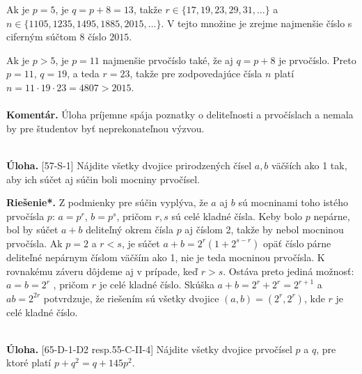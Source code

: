 \documentclass[11pt,a4paper,oneside,final]{book}
\newcommand{\kom}{\textbf{Komentár.} }
\newcommand{\ul}{\textbf{Úloha.} }
\newcommand{\rieh}{\textbf{Riešenie*.} }
\begin{document}
Ak je $p = 5$, je $q = p + 8 = 13$, takže $r \in \{17, 19, 23, 29, 31, \ldots \}$ a $n \in \{1 105,1 235, 1 495, 1 885, 2 015, \ldots\}$. V tejto množine je zrejme najmenšie číslo s ciferným súčtom 8 číslo $2 015$.

Ak je $p > 5$, je $p = 11$ najmenšie prvočíslo také, že aj $q = p + 8$ je prvočíslo. Preto $p = 11$, $q = 19$, a teda $r = 23$, takže pre zodpovedajúce čísla $n$ platí $n = 11 \cdot 19 \cdot 23= 4 807 > 2 015$.\\
\\
\kom Úloha príjemne spája poznatky o deliteľnosti a prvočíslach a nemala by pre študentov byť neprekonateľnou výzvou.\\
\\
\begin{tcolorbox}[breakable,notitle,boxrule=0pt,colback=light-gray,colframe=light-gray]\ul [57-S-1]
Nájdite všetky dvojice prirodzených čísel $a, b$ väčších ako 1 tak, aby ich súčet aj súčin boli mocniny prvočísel.

\end{tcolorbox}

\rieh Z podmienky pre súčin vyplýva, že $a$ aj $b$ sú mocninami toho istého prvočísla $p$: $a = p^r$, $b = p^s$, pričom $r, s$ sú celé kladné čísla. Keby bolo $p$ nepárne, bol by súčet $a + b$ deliteľný okrem čísla $p$ aj číslom 2, takže by nebol mocninou prvočísla. Ak $p = 2$ a $r < s$, je súčet $a + b = 2^r (1 + 2^{s-r})$ opäť číslo párne deliteľné nepárnym číslom väčším ako 1, nie je teda mocninou prvočísla. K rovnakému záveru dôjdeme aj v prípade, keď $r > s$. Ostáva preto jediná možnosť: $a = b = 2^r$ , pričom $r$ je celé kladné číslo. Skúška $a+b = 2^r +2^r = 2^{r+1}$ a $ab = 2^{2r}$ potvrdzuje, že riešením sú všetky dvojice $(a, b) = (2^r, 2^r)$, kde $r$ je celé kladné číslo.\\
\\
\begin{tcolorbox}[breakable,notitle,boxrule=0pt,colback=light-gray,colframe=light-gray]\ul [65-D-1-D2 resp.55-C-II-4] Nájdite všetky dvojice prvočísel $p$ a $q$, pre ktoré platí $p + q^2= q + 145p^2$.

\end{tcolorbox}
\end{document}
